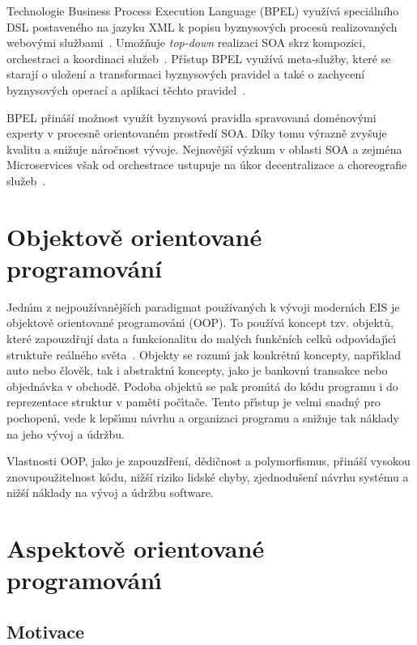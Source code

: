 Technologie Business Process Execution Language (\gls{BPEL}) využívá speciálního \gls{DSL}
postaveného na jazyku \gls{XML} k popisu byznysových procesů realizovaných webovými
službami~\cite{andrews2003business}. Umožňuje \textit{top-down} realizaci \gls{SOA}
skrz kompozici, orchestraci a koordinaci služeb~\cite{oraclebpel}.
Přístup \gls{BPEL} využívá meta-služby, které se starají o uložení a transformaci byznysových pravidel
a také o zachycení byznysových operací a aplikaci těchto pravidel~\cite{rosenberg2005business}.

\gls{BPEL} přináší možnost využít byznysová pravidla spravovaná doménovými experty
v procesně orientovaném prostředí \gls{SOA}. Díky tomu výrazně zvyšuje kvalitu a snižuje
náročnost vývoje. Nejnovější výzkum v oblasti \gls{SOA} a zejména Microservices
však od orchestrace ustupuje na úkor decentralizace a choreografie
služeb~\cite{bakshi2017microservices}\cite{cerny2018contextual}.

\section{Objektově orientované programování}\label{sec:oop}

Jedn\'{\i}m z nejpoužívanějších paradigmat používaných k
v\'yvoji modern\'{\i}ch \gls{EIS} je objektově orientované programován\'{\i} (\gls{OOP}).
To používá koncept tzv. objektů, které zapouzdřují data a funkcionalitu do
malých funkčních celků odpov\'{\i}daj\'{\i}c\'{\i} struktuře reálného světa~\cite{rentsch1982object}.
Objekty se rozum\'{\i} jak konkrétn\'{\i} koncepty, např\'{\i}klad auto nebo člověk, tak i
abstraktn\'{\i} koncepty, jako je bankovn\'{\i} transakce nebo objednávka v obchodě.
Podoba objektů se pak prom\'{\i}tá do kódu programu i do reprezentace struktur v paměti
poč\'{\i}tače. Tento př\'{\i}stup je velmi snadn\'y pro pochopen\'{\i},
vede k lepš\'{\i}mu návrhu a organizaci programu a snižuje
tak náklady na jeho v\'yvoj a údržbu.

Vlastnosti \gls{OOP}, jako je zapouzdření, dědičnost a polymorfismus, přináší
vysokou znovupoužitelnost kódu, nižší riziko lidské chyby, zjednodušení
návrhu systému a nižší náklady na vývoj a údržbu software.

\section{Aspektově orientované programován\'{\i}}\label{sec:aop}

\subsection{Motivace}

